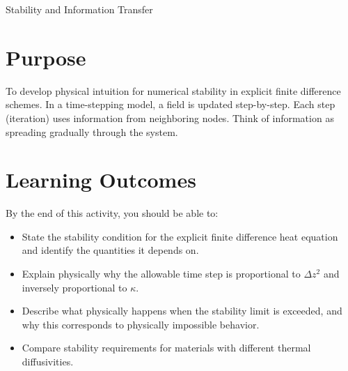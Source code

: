 \begin{activity}{Stability and Information Transfer}

\section*{Purpose}
To develop physical intuition for numerical stability in explicit finite difference schemes.  In a time-stepping model, a field is updated step-by-step. Each step (iteration) uses information from neighboring nodes.  Think of information as spreading gradually through the system.

\section*{Learning Outcomes}

By the end of this activity, you should be able to:
\begin{itemize}
  \item State the stability condition for the explicit finite difference heat equation and identify the quantities it depends on.
  \item Explain physically why the allowable time step is proportional to $\Delta z^2$ and inversely proportional to $\kappa$.
  \item Describe what physically happens when the stability limit is exceeded, and why this corresponds to physically impossible behavior.
  \item Compare stability requirements for materials with different thermal diffusivities.
\end{itemize}

\end{activity}
